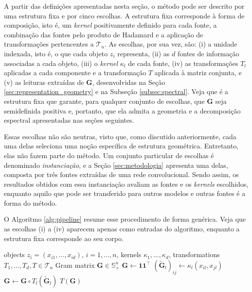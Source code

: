 A partir das definições apresentadas nesta seção, o método pode ser descrito por uma estrutura fixa e por cinco escolhas. A estrutura fixa corresponde à forma de composição, isto é, um \textit{kernel} positivamente definido para cada fonte, a combinação das fontes pelo produto de Hadamard e a aplicação de transformações pertencentes a $\mathcal{T}_n$. As escolhas, por sua vez, são: (i) a unidade indexada, isto é, o que cada objeto $z_i$ representa, (ii) as $d$ fontes de informação associadas a cada objeto, (iii) o \textit{kernel} $\kappa_l$ de cada fonte, (iv) as transformações $T_l$ aplicadas a cada componente e a transformação $T$ aplicada à matriz conjunta, e (v) as leituras extraídas de $\mathbf{G}$, desenvolvidas na Seção \ref{sec:representation_geometry} e na Subseção \ref{subsec:spectral}. Veja que é a estrutura fixa que garante, para qualquer conjunto de escolhas, que $\mathbf{G}$ seja semidefinida positiva e, portanto, que ela admita a geometria e a decomposição espectral apresentadas nas seções seguintes.

Essas escolhas não são neutras, visto que, como discutido anteriormente, cada uma delas seleciona uma noção específica de estrutura geométrica. Entretanto, elas não fazem parte do método. Um conjunto particular de escolhas é denominado \emph{instanciação}, e a Seção \ref{sec:metodologia} apresenta uma delas, composta por três fontes extraídas de uma rede convolucional. Sendo assim, os resultados obtidos com essa instanciação avaliam as fontes e os \textit{kernels} escolhidos, enquanto aquilo que pode ser transferido para outros modelos e outras fontes é a forma do método.

O Algoritmo \ref{alg:pipeline} resume esse procedimento de forma genérica. Veja que as escolhas (i) a (iv) aparecem apenas como entradas do algoritmo, enquanto a estrutura fixa corresponde ao seu corpo.

\begin{algorithm}[htbp]
\caption{Kernel-transformation pipeline}
\label{alg:pipeline}
\begin{algorithmic}[1]
\Require objects $z_i = (x_{i1},\dots,x_{id})$, $i = 1,\dots,n$, kernels $\kappa_1,\dots,\kappa_d$, transformations $T_1,\dots,T_d, T \in \mathcal{T}_n$
\Ensure Gram matrix $\mathbf{G} \in \mathbb{S}_+^n$
\State $\mathbf{G} \gets \mathbf{1}\mathbf{1}^\top$
        \State $(\widetilde{\mathbf{G}}_l)_{ij} \gets \kappa_l(x_{il}, x_{jl})$ 
    \EndFor
    \State $\mathbf{G} \gets \mathbf{G} \circ T_l(\widetilde{\mathbf{G}}_l)$ 
\EndFor
\State \Return $T(\mathbf{G})$
\end{algorithmic}
\end{algorithm}
